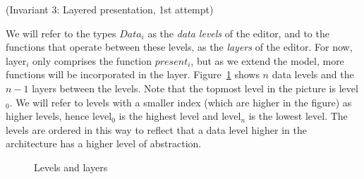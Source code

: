 \documentclass[twoside,epsf]{report}
\begin{document}
{\centering (Invariant 3: Layered presentation, 1st attempt)\\}\vspace{1em} 

We will refer to the types $Data_i$ as the {\em data levels} of the editor, and to the functions that operate between these levels, as the {\em layers} of the editor. For now, layer$_i$ only comprises the function $present_i$, but as we extend the model, more functions will be incorporated in the layer. Figure~\ref{levelsandlayers} shows $n$ data levels and the $n-1$ layers between the levels. Note that the topmost level in the picture is level$_0$. We will refer to levels with a smaller index (which are higher in the figure) as higher levels, hence level$_0$ is the highest level and level$_n$ is the lowest level. The levels are ordered in this way to reflect that a data level higher in the architecture has a higher level of abstraction. 
\begin{figure}
\begin{small}
\begin{center}
\begin{center}
\begin{small}
\bigskip \noindent
{}
\end{small}
\end{center}\caption{Levels and layers}\label{levelsandlayers} 
\end{center}
\end{small}
\end{figure}
\end{document}

